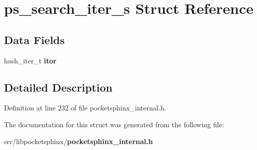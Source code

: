 \section{ps\-\_\-search\-\_\-iter\-\_\-s Struct Reference}
\label{structps__search__iter__s}
\subsection*{Data Fields}
\begin{DoxyCompactItemize}
\item 
hash\-\_\-iter\-\_\-t {\bfseries itor}\label{structps__search__iter__s_a08c98d4145043af325263a80020758f7}

\end{DoxyCompactItemize}


\subsection{Detailed Description}


Definition at line 232 of file pocketsphinx\-\_\-internal.\-h.



The documentation for this struct was generated from the following file\-:\begin{DoxyCompactItemize}
\item 
src/libpocketsphinx/{\bf pocketsphinx\-\_\-internal.\-h}\end{DoxyCompactItemize}
